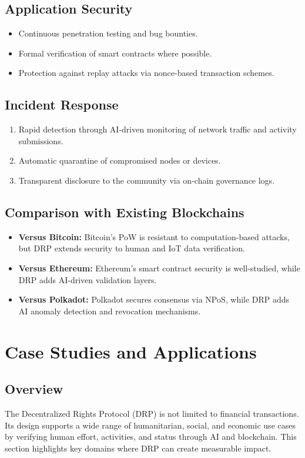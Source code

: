 \documentclass[11pt,a4paper]{article}
\begin{document}
\subsection{Application Security}
\begin{itemize}
    \item Continuous penetration testing and bug bounties.
    \item Formal verification of smart contracts where possible.
    \item Protection against replay attacks via nonce-based transaction schemes.
\end{itemize}

\subsection{Incident Response}
\begin{enumerate}
    \item Rapid detection through AI-driven monitoring of network traffic and activity submissions.
    \item Automatic quarantine of compromised nodes or devices.
    \item Transparent disclosure to the community via on-chain governance logs.
\end{enumerate}

\subsection{Comparison with Existing Blockchains}
\begin{itemize}
    \item \textbf{Versus Bitcoin:} Bitcoin’s PoW is resistant to computation-based attacks, but DRP extends security to human and IoT data verification.
    \item \textbf{Versus Ethereum:} Ethereum’s smart contract security is well-studied, while DRP adds AI-driven validation layers.
    \item \textbf{Versus Polkadot:} Polkadot secures consensus via NPoS, while DRP adds AI anomaly detection and revocation mechanisms.
\end{itemize}

\section{Case Studies and Applications}

\subsection{Overview}
The Decentralized Rights Protocol (DRP) is not limited to financial transactions. Its design supports a wide range of humanitarian, social, and economic use cases by verifying human effort, activities, and status through AI and blockchain. This section highlights key domains where DRP can create measurable impact.
\end{document}
